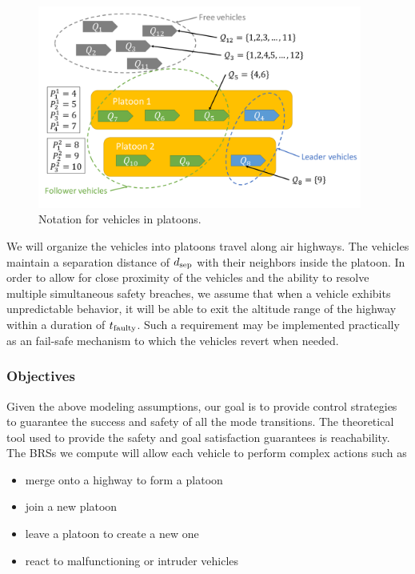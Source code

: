 \begin{figure}
	\centering
	\includegraphics[width=0.95\textwidth]{"fig/vehicleNotation"}
	\caption{Notation for vehicles in platoons.}
	\label{fig:vehicleNotation}
\end{figure}

We will organize the vehicles into platoons travel along air highways. The vehicles maintain a separation distance of $d_\text{sep}$ with their neighbors inside the platoon. In order to allow for close proximity of the vehicles and the ability to resolve multiple simultaneous safety breaches, we assume that when a vehicle exhibits unpredictable behavior, it will be able to exit the altitude range of the highway within a duration of $t_\text{faulty}$. Such a requirement may be implemented practically as an fail-safe mechanism to which the vehicles revert when needed.

\subsubsection{Objectives}
Given the above modeling assumptions, our goal is to provide control strategies to guarantee the success and safety of all the mode transitions. The theoretical tool used to provide the safety and goal satisfaction guarantees is reachability. The BRSs we compute will allow each vehicle to perform complex actions such as 


\begin{itemize}
\item merge onto a highway to form a platoon
\item join a new platoon
\item leave a platoon to create a new one
\item react to malfunctioning or intruder vehicles
\end{itemize}

